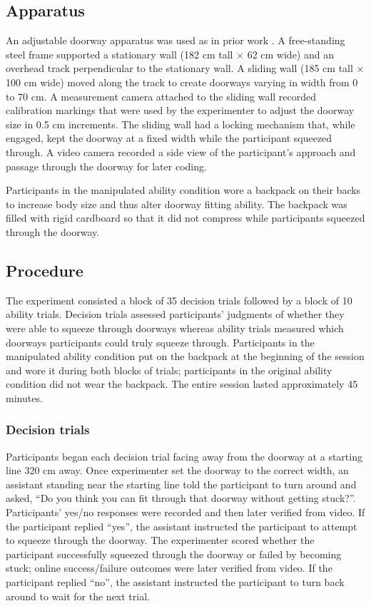 \documentclass[a4paper,man,natbib,floatsintext,noextraspace]{apa6}
\begin{document}
\subsection{Apparatus}

An adjustable doorway apparatus was used as in prior work \citep{DoorwayLearning,Recal}. A free-standing steel frame supported a stationary wall (182 cm tall × 62 cm wide) and an overhead track perpendicular to the stationary wall. A sliding wall (185 cm tall × 100 cm wide) moved along the track to create doorways varying in width from 0 to 70 cm. A measurement camera attached to the sliding wall recorded calibration markings that were used by the experimenter to adjust the doorway size in 0.5 cm increments. The sliding wall had a locking mechanism that, while engaged, kept the doorway at a fixed width while the participant squeezed through. A video camera recorded a side view of the participant’s approach and passage through the doorway for later coding.

Participants in the manipulated ability condition wore a backpack  on their backs to increase body size and thus alter doorway fitting ability. The backpack was filled with rigid cardboard so that it did not compress while participants squeezed through the doorway. 

\subsection{Procedure}

The experiment consisted a block of 35 decision trials followed by a block of 10 ability trials. Decision trials assessed participants’ judgments of whether they were able to squeeze through doorways whereas ability trials measured which doorways participants could truly squeeze through. Participants in the manipulated ability condition put on the backpack at the beginning of the session and wore it during both blocks of trials; participants in the original ability condition did not wear the backpack. The entire session lasted approximately 45 minutes. 

\subsubsection{Decision trials}

Participants began each decision trial facing away from the doorway at a starting line 320 cm away. Once experimenter set the doorway to the correct width, an assistant standing near the starting line told the participant to turn around and asked, “Do you think you can fit through that doorway without getting stuck?”. Participants’ yes/no responses were recorded and then later verified from video. If the participant replied “yes”, the assistant instructed the participant to attempt to squeeze through the doorway. The experimenter scored whether the participant successfully squeezed through the doorway or failed by becoming stuck; online success/failure outcomes were later verified from video. If the participant replied “no”, the assistant instructed the participant to turn back around to wait for the next trial.
\end{document}
